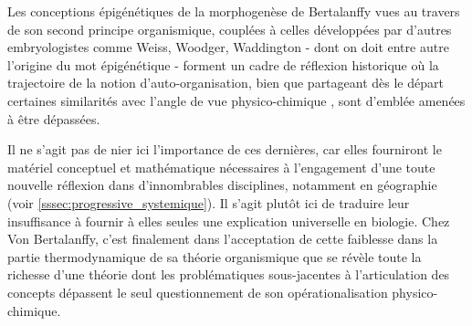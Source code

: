 

Les conceptions épigénétiques de la morphogenèse de Bertalanffy vues au travers de son second principe organismique, couplées à celles développées par d'autres embryologistes comme Weiss, Woodger, Waddington - dont on doit entre autre l'origine du mot épigénétique -  forment un cadre de réflexion historique où la trajectoire de la notion d'auto-organisation, bien que partageant dès le départ certaines similarités avec l'angle de vue physico-chimique \autocite{Prigogine1946}, sont d'emblée amenées à être dépassées.

Il ne s'agit pas de nier ici l'importance de ces dernières, car elles fourniront le matériel conceptuel et mathématique nécessaires à l'engagement d'une toute nouvelle réflexion dans d'innombrables disciplines, notamment en géographie (voir \ref{sssec:progressive_systemique}). Il s'agit plutôt ici de traduire leur insuffisance à fournir à elles seules une explication universelle en biologie. Chez Von Bertalanffy, c'est finalement dans l’acceptation \autocite[657-661]{Pouvreau2013} de cette faiblesse dans la partie thermodynamique de sa théorie organismique que se révèle toute la richesse d'une théorie dont les problématiques sous-jacentes à l'articulation des concepts dépassent le seul questionnement de son opérationalisation physico-chimique.


